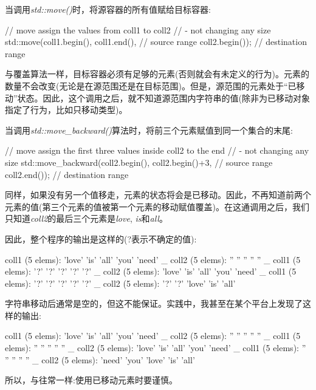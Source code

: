当调用\textit{std::move()}时，将源容器的所有值赋给目标容器:

\begin{cppcode}
// move assign the values from coll1 to coll2
// - not changing any size
std::move(coll1.begin(), coll1.end(), // source range
		  coll2.begin()); // destination range
\end{cppcode}

与覆盖算法一样，目标容器必须有足够的元素(否则就会有未定义的行为)。元素的数量不会改变(无论是在源范围还是在目标范围)。但是，源范围的元素处于“已移动”状态。因此，这个调用之后，就不知道源范围内字符串的值(除非为已移动对象指定了行为，比如只移动类型)。

当调用\textit{std::move_backward()}算法时，将前三个元素赋值到同一个集合的末尾:

\begin{cppcode}
// move assign the first three values inside coll2 to the end
// - not changing any size
std::move_backward(coll2.begin(), coll2.begin()+3, // source range
				   coll2.end()); // destination range
\end{cppcode}

同样，如果没有另一个值移走，元素的状态将会是已移动。因此，不再知道前两个元素的值(第三个元素的值被第一个元素的移动赋值覆盖)。在这通调用之后，我们只知道\textit{coll2}的最后三个元素是\textit{love}, \textit{is}和\textit{all}。

因此，整个程序的输出是这样的(?表示不确定的值):

\begin{shell}
	coll1 (5 elems): 'love' 'is' 'all' 'you' 'need' _
	coll2 (5 elems): '' '' '' '' '' _
	coll1 (5 elems): '?' '?' '?' '?' '?' _
	coll2 (5 elems): 'love' 'is' 'all' 'you' 'need' _
	coll1 (5 elems): '?' '?' '?' '?' '?' _
	coll2 (5 elems): '?' '?' 'love' 'is' 'all'
\end{shell}

字符串移动后通常是空的，但这不能保证。实践中，我甚至在某个平台上发现了这样的输出:

\begin{shell}
	coll1 (5 elems): 'love' 'is' 'all' 'you' 'need' _
	coll2 (5 elems): '' '' '' '' '' _
	coll1 (5 elems): '' '' '' '' '' _
	coll2 (5 elems): 'love' 'is' 'all' 'you' 'need' _
	coll1 (5 elems): '' '' '' '' '' _
	coll2 (5 elems): 'need' 'you' 'love' 'is' 'all'
\end{shell}


所以，与往常一样:使用已移动元素时要谨慎。
































